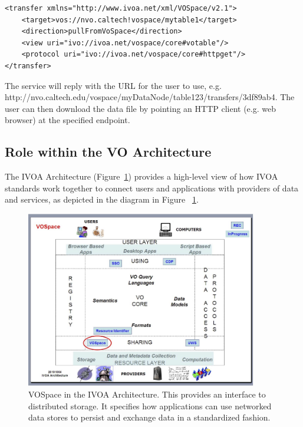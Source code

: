 \documentclass[11pt,a4paper]{ivoa}
\begin{document}
\begin{lstlisting}
<transfer xmlns="http://www.ivoa.net/xml/VOSpace/v2.1">
    <target>vos://nvo.caltech!vospace/mytable1</target>
    <direction>pullFromVoSpace</direction> 
    <view uri="ivo://ivoa.net/vospace/core#votable"/> 
    <protocol uri="ivo://ivoa.net/vospace/core#httpget"/>  
</transfer>
\end{lstlisting}

The service will reply with the URL for the user to use, e.g. http://nvo.caltech.edu/vospace/myDataNode/table123/transfers/3df89ab4. The user can then download the data file by pointing an HTTP client (e.g. web browser) at the specified endpoint.

\subsection{Role within the VO Architecture}
\label{subsec:role within the vo architecture}

The IVOA Architecture (Figure~\ref{fig:archdiag}) provides a high-level view of how IVOA standards work together to connect users and applications with providers of data and services, as depicted in the diagram in Figure ~\ref{fig:archdiag}.

\begin{figure}
\centering


\includegraphics[width=0.9\textwidth]{archdiag.png}
\caption{VOSpace in the IVOA Architecture. This provides an interface to distributed storage. It specifies how applications can use networked data stores to persist and exchange data in a standardized fashion.}
\label{fig:archdiag}
\end{figure}
\end{document}
